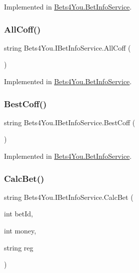 Implemented in \mbox{\hyperlink{class_bets4_you_1_1_bet_info_service_a911a79019d2aa6dc66aa4c14c6d3d500}{Bets4\+You.\+Bet\+Info\+Service}}.

\mbox{\label{interface_bets4_you_1_1_i_bet_info_service_a3b8eab8c72aedf36c5b44c35bf51df4e}} 
\subsubsection{\texorpdfstring{AllCoff()}{AllCoff()}}
{\footnotesize\ttfamily string Bets4\+You.\+I\+Bet\+Info\+Service.\+All\+Coff (\begin{DoxyParamCaption}{ }\end{DoxyParamCaption})}



Implemented in \mbox{\hyperlink{class_bets4_you_1_1_bet_info_service_a3df2201fec0a81c97b362f3e7cb90577}{Bets4\+You.\+Bet\+Info\+Service}}.

\mbox{\label{interface_bets4_you_1_1_i_bet_info_service_a10d69b8875de331135a893a8bb3c057e}} 
\subsubsection{\texorpdfstring{BestCoff()}{BestCoff()}}
{\footnotesize\ttfamily string Bets4\+You.\+I\+Bet\+Info\+Service.\+Best\+Coff (\begin{DoxyParamCaption}{ }\end{DoxyParamCaption})}



Implemented in \mbox{\hyperlink{class_bets4_you_1_1_bet_info_service_aa61e540cfbd81810e011755534d6db05}{Bets4\+You.\+Bet\+Info\+Service}}.

\mbox{\label{interface_bets4_you_1_1_i_bet_info_service_a79929162b26a32f83ceac33c5930197f}} 
\subsubsection{\texorpdfstring{CalcBet()}{CalcBet()}}
{\footnotesize\ttfamily string Bets4\+You.\+I\+Bet\+Info\+Service.\+Calc\+Bet (\begin{DoxyParamCaption}\item[{int}]{bet\+Id,  }\item[{int}]{money,  }\item[{string}]{reg }\end{DoxyParamCaption})}



